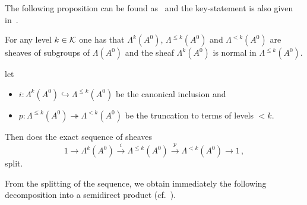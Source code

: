 The following proposition can be found as~\cite[Prop.I.5.1]{Loday1994} and the
key-statement is also given in~\cite[Prop.4.10]{Martinet1991}.
\begin{prop}\label{prop:PropertiesOfStokesSheafSplitting}
  For any level $k\in\mathcal{K}$ one has that $\Lambda^{k}(A^0)$,
  $\Lambda^{\leq k}(A^0)$ and $\Lambda^{<k}(A^0)$ are sheaves of subgroups of
  $\Lambda(A^0)$ and the sheaf $\Lambda^k(A^0)$ is normal in
  $\Lambda^{\leq k}(A^0)$.
  \begin{comment}
    A subgroup $N$ is normal in $G$ ($N\vartriangleleft G$) if it is stable
    under conjugation, i.e.
    \[
      N\vartriangleleft G \Leftrightarrow \forall n\in N \forall g\in G,
      gng^{-1}\in N ,.
    \]
  \end{comment}

   let
  \begin{itemize}
    \item $i:\Lambda^k(A^0)\hookrightarrow\Lambda^{\leq k}(A^0)$ be the
      canonical inclusion and
    \item $p:\Lambda^{\leq k}(A^0)\twoheadrightarrow\Lambda^{<k}(A^0)$ be the
      truncation to terms of levels $<k$.
  \end{itemize}
  Then does the exact sequence of sheaves
  \[
    1\longrightarrow\Lambda^k(A^0)
    \overset{i}\longrightarrow\Lambda^{\leq k}(A^0)
    \overset{p}\longrightarrow\Lambda^{<k}(A^0)
    \longrightarrow 1 \,,
  \]
  split.
\end{prop}
From the splitting of the sequence, we obtain immediately the following
decomposition into a semidirect product (cf.\ \cite[75]{Robinson2003An}).
